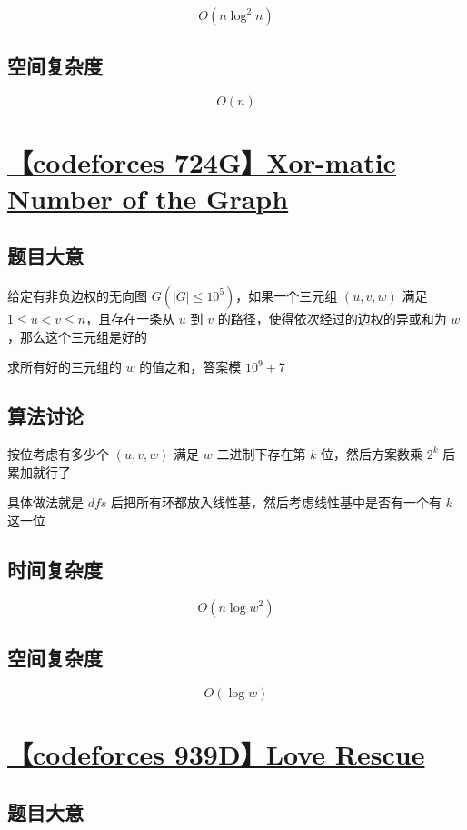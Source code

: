 \documentclass[UTF8]{article}
\begin{document}
$$
O(n \log^2 n)
$$

\subsection{空间复杂度}

$$
O(n)
$$

\section{\href{https://codeforces.com/problemset/problem/724/G}{【codeforces 724G】Xor-matic Number of the Graph}}

\subsection{题目大意}

给定有非负边权的无向图 $G(|G| \le 10^5)$，如果一个三元组 $(u,v,w)$ 满足 $1 \le u < v \le n$，且存在一条从 $u$ 到 $v$ 的路径，使得依次经过的边权的异或和为 $w$，那么这个三元组是好的

求所有好的三元组的 $w$ 的值之和，答案模 $10^9+7$

\subsection{算法讨论}

按位考虑有多少个 $(u,v,w)$ 满足 $w$ 二进制下存在第 $k$ 位，然后方案数乘 $2^k$ 后累加就行了

具体做法就是 $dfs$ 后把所有环都放入线性基，然后考虑线性基中是否有一个有 $k$ 这一位

\subsection{时间复杂度}

$$
O(n \log w^2)
$$

\subsection{空间复杂度}

$$
O(\log w)
$$

\section{\href{https://codeforces.com/problemset/problem/939/D}{【codeforces 939D】Love Rescue}}

\subsection{题目大意}
\end{document}
